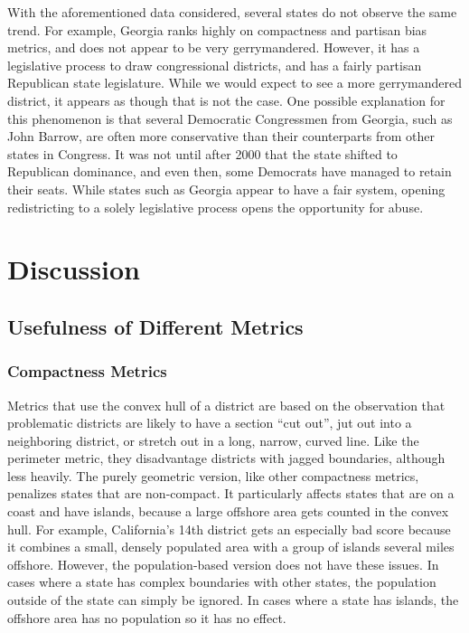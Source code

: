 \documentclass[12pt]{article}
\begin{document}
With the aforementioned data considered, several states do not observe the same trend.  For example, Georgia ranks highly on compactness and partisan bias metrics, and does not appear to be very gerrymandered.  However, it has a legislative process to draw congressional districts, and has a fairly partisan Republican state legislature.  While we would expect to see a more gerrymandered district, it appears as though that is not the case.  One possible explanation for this phenomenon is that several Democratic Congressmen from Georgia, such as John Barrow, are often more conservative than their counterparts from other states in Congress.  It was not until after 2000 that the state shifted to Republican dominance, and even then, some Democrats have managed to retain their seats.  While states such as Georgia appear to have a fair system, opening redistricting to a solely legislative process opens the opportunity for abuse.

  \section{Discussion}
  \subsection{Usefulness of Different Metrics}
  \subsubsection{Compactness Metrics}
  Metrics that use the convex hull of a district are based on the observation that problematic districts are likely to have a section ``cut out'', jut out into a neighboring district, or stretch out in a long, narrow, curved line. Like the perimeter metric, they disadvantage districts with jagged boundaries, although less heavily. The purely geometric version, like other compactness metrics, penalizes states that are non-compact. It particularly affects states that are on a coast and have islands, because a large offshore area gets counted in the convex hull. For example, California's 14th district gets an especially bad score because it combines a small, densely populated area with a group of islands several miles offshore. However, the population-based version does not have these issues. In cases where a state has complex boundaries with other states, the population outside of the state can simply be ignored. In cases where a state has islands, the offshore area has no population so it has no effect.
  
\end{document}
